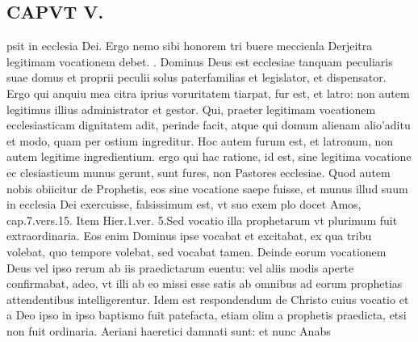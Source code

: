 \documentclass{article}
\begin{document}
\begin{pages}
\section*{CAPVT V. }
\marginpar{[ p.343 ]}\pstart psit in ecclesia Dei. Ergo nemo sibi honorem tri buere meccienla Derjeitra legitimam vocationem debet.  \pend{}. Dominus Deus est ecclesiae tanquam peculiaris suae domus et proprii peculii solus paterfamilias et legislator, et dispensator. Ergo qui anquiu mea citra iprius voruritatem tiarpat, fur est, et latro: non autem legitimus illius administrator et gestor.  \pend{} Qui, praeter legitimam vocationem ecclesiasticam dignitatem adit, perinde facit, atque qui domum alienam alio’aditu et modo, quam per ostium ingreditur. Hoc autem furum est, et latronum, non autem legitime ingredientium. ergo qui hac ratione, id est, sine legitima vocatione ec clesiasticum munus gerunt, sunt fures, non Pastores ecclesiae.  \pend\pstart Quod autem nobis obiicitur de Prophetis, eos sine vocatione saepe fuisse, et munus illud suum in ecclesia Dei exercuisse, falsissimum est, vt suo exem plo docet Amos, cap.7.vers.15. Item Hier.1.ver. 5.Sed vocatio illa prophetarum vt plurimum fuit extraordinaria. Eos enim Dominus ipse vocabat et excitabat, ex qua tribu volebat, quo tempore volebat, sed vocabat tamen. Deinde eorum vocationem Deus vel ipso rerum ab iis praedictarum euentu: vel aliis modis aperte confirmabat, adeo, vt illi ab eo missi esse satis ab omnibus ad eorum prophetias attendentibus intelligerentur. Idem est respondendum de Christo cuius vocatio et a Deo ipso in ipso baptismo fuit patefacta, etiam olim a prophetis praedicta, etsi non fuit ordinaria.  \pend\pstart Aeriani haeretici damnati sunt: et nunc Anabs\pend

\end{pages}
\end{document}
